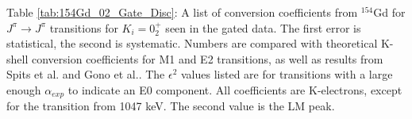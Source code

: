 \begin{landscape}
\begin{table}
\begin{ThreePartTable}
        \makeatletter\def\TPT@hsize{}\makeatletter
        
        \begin{tablenotes}
            Table \ref{tab:154Gd_02_Gate_Disc}: A list of conversion coefficients from $^{154}$Gd for $J^{\pi}\rightarrow J^{\pi}$ transitions for $K_i=0^+_2$ seen in the gated data. The first error is statistical, the second is systematic. Numbers are compared with theoretical K-shell conversion coefficients for M1 and E2 transitions, as well as results from Spits et al.\citep{spits96:_154gd} and Gono et al.\citep{gono74:_154gd_e0}. The $\epsilon^2$ values listed are for transitions with a large enough $\alpha_{exp}$ to indicate an E0 component. All coefficients are K-electrons, except for the transition from 1047 keV. The second value is the LM peak.
        \end{tablenotes}
\end{ThreePartTable}
\end{table}
\end{landscape}

